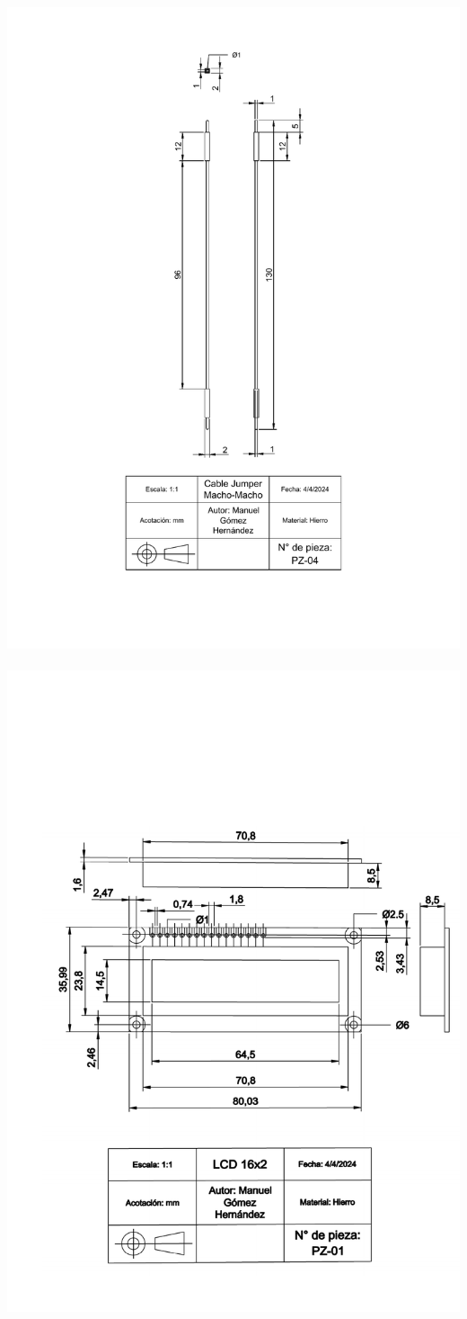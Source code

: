 \includegraphics[width=.9\textwidth]{15/img/cableJumperMMTrazo.pdf}~\\[15cm]
\includegraphics[width=.9\textwidth]{15/img/lcdTrazo.pdf}~\\[15cm]
